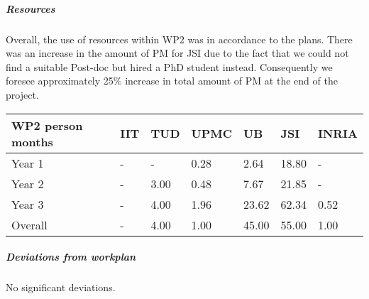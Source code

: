
\subparagraph{Resources}
Overall, the use of resources within WP2 was in accordance to the plans. There was an increase in the amount of PM for JSI due to the fact that we could not find a suitable Post-doc but hired a PhD student instead. Consequently we foresee approximately 25\% increase in total amount of PM at the end of the project.

\begin{center}
\begin{tabular}{|C{1.5cm}|C{1.5cm}|C{1.5cm}|C{2cm}|C{2cm}|C{2cm}|C{2cm}|}
\hline
\footnotesize \textbf{WP2 person months}& \footnotesize \textbf{IIT}&\footnotesize \textbf{TUD}&\footnotesize \textbf{UPMC}& \footnotesize \textbf{UB} &\footnotesize \textbf{JSI} & \footnotesize \textbf{INRIA} \\ \hline
\footnotesize Year 1 &  -     & - & 0.28 & 2.64 & 18.80  &-  \\  \hline
\footnotesize Year 2 &  -     & 3.00 & 0.48 & 7.67 & 21.85  &-  \\  \hline
\footnotesize Year 3 &  - & 4.00 & 1.96 & 23.62 & 62.34 & 0.52  \\ 
\hline \hline
\footnotesize Overall & -     & 4.00 & 1.00 & 45.00 & 55.00 & 1.00 \\ \hline
\end{tabular}
\end{center}

\subparagraph{Deviations from workplan} 
No significant deviations.